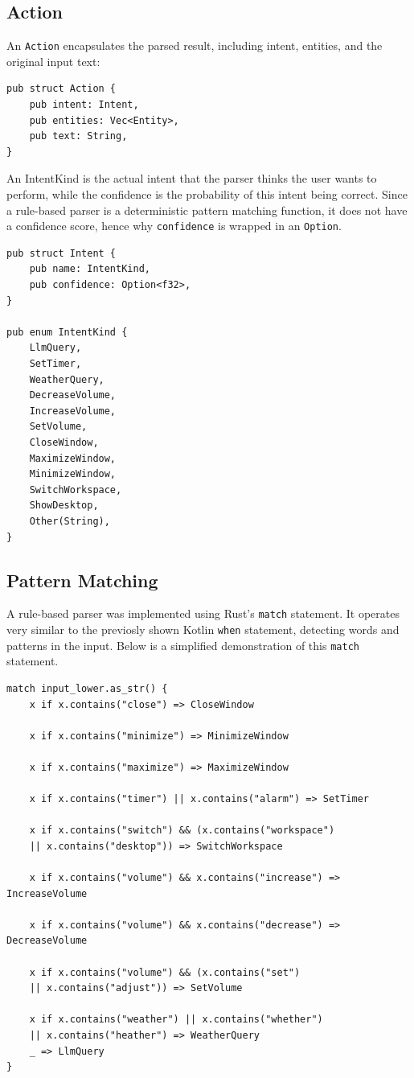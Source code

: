 \subsection{Action}
An \texttt{Action} encapsulates the parsed result, including intent, entities, and the original input text:

\begin{verbatim}
pub struct Action {
    pub intent: Intent,
    pub entities: Vec<Entity>,
    pub text: String,
}
\end{verbatim}

An IntentKind is the actual intent that the parser thinks the user wants to perform, while the confidence
is the probability of this intent being correct. Since a rule-based parser is a deterministic pattern matching function,
it does not have a confidence score, hence why \texttt{confidence} is wrapped in an \texttt{Option}.

\begin{verbatim}
pub struct Intent {
    pub name: IntentKind,
    pub confidence: Option<f32>,
}

pub enum IntentKind {
    LlmQuery,
    SetTimer,
    WeatherQuery,
    DecreaseVolume,
    IncreaseVolume,
    SetVolume,
    CloseWindow,
    MaximizeWindow,
    MinimizeWindow,
    SwitchWorkspace,
    ShowDesktop,
    Other(String),
}
\end{verbatim}

\subsection{Pattern Matching}
A rule-based parser was implemented using Rust's \texttt{match} statement.
It operates very similar to the previosly shown Kotlin \texttt{when} statement, detecting words and patterns in the input.
Below is a simplified demonstration of this \texttt{match} statement.

\begin{verbatim}
match input_lower.as_str() {
    x if x.contains("close") => CloseWindow
    
    x if x.contains("minimize") => MinimizeWindow

    x if x.contains("maximize") => MaximizeWindow

    x if x.contains("timer") || x.contains("alarm") => SetTimer

    x if x.contains("switch") && (x.contains("workspace")
    || x.contains("desktop")) => SwitchWorkspace

    x if x.contains("volume") && x.contains("increase") => IncreaseVolume

    x if x.contains("volume") && x.contains("decrease") => DecreaseVolume

    x if x.contains("volume") && (x.contains("set")
    || x.contains("adjust")) => SetVolume

    x if x.contains("weather") || x.contains("whether")
    || x.contains("heather") => WeatherQuery
    _ => LlmQuery
}
\end{verbatim}


